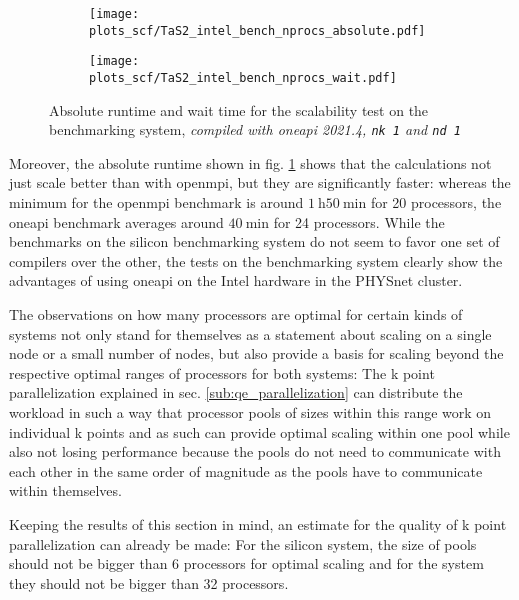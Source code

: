 \documentclass[main.tex]{subfiles}
\begin{document}
\begin{figure}[ht!]
    \begin{subfigure}[b]{0.49\textwidth}
        \centering
        \texttt{[image: plots\_scf/TaS2\_intel\_bench\_nprocs\_absolute.pdf]}
    \end{subfigure}
    \begin{subfigure}[b]{0.49\textwidth}
        \centering
        \texttt{[image: plots\_scf/TaS2\_intel\_bench\_nprocs\_wait.pdf]}
    \end{subfigure}
    \caption{Absolute runtime and wait time for the scalability test on the \TaS benchmarking system, \emph{\QE compiled with \gls{oneapi} 2021.4, \texttt{nk 1} and \texttt{nd 1}}}
    \label{fig:scaling_scf_intel_nprocs_tas2_absolute_wait}
\end{figure}
Moreover, the absolute runtime shown in fig. \ref{fig:scaling_scf_intel_nprocs_tas2_absolute_wait} shows that the calculations not just scale better than with \gls{openmpi}, but they are significantly faster: whereas the minimum for the \gls{openmpi} benchmark is around \(\SI{1}{\hour} \SI{50}{\minute}\) for 20 processors, the \gls{oneapi} benchmark averages around \(\SI{40}{\minute}\) for 24 processors.
While the benchmarks on the silicon benchmarking system do not seem to favor one set of compilers over the other, the tests on the \TaS benchmarking system clearly show the advantages of using \gls{oneapi} on the Intel hardware in the PHYSnet cluster.

The observations on how many processors are optimal for certain kinds of systems not only stand for themselves as a statement about scaling on a single node or a small number of nodes, but also provide a basis for scaling beyond the respective optimal ranges of processors for both systems:
The k point parallelization explained in sec. \ref{sub:qe_parallelization} can distribute the workload in such a way that processor pools of sizes within this range work on individual k points and as such can provide optimal scaling within one pool while also not losing performance because the pools do not need to communicate with each other in the same order of magnitude as the pools have to communicate within themselves.

Keeping the results of this section in mind, an estimate for the quality of k point parallelization can already be made:
For the silicon system, the size of pools should not be bigger than 6 processors for optimal scaling and for the \TaS system they should not be bigger than 32 processors.
\end{document}
